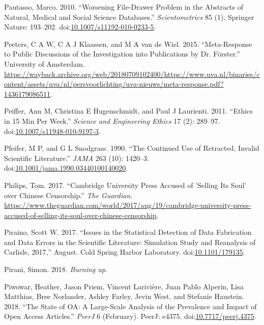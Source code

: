 \documentclass[a5paper]{book}
\begin{document}
\hypertarget{ref-doi:10.1007ux2fs11192-010-0233-5}{}
Pautasso, Marco. 2010. ``Worsening File-Drawer Problem in the Abstracts
of Natural, Medical and Social Science Databases.''
\emph{Scientometrics} 85 (1). Springer Nature: 193--202.
doi:\href{https://doi.org/10.1007/s11192-010-0233-5}{10.1007/s11192-010-0233-5}.

\hypertarget{ref-peeters2015}{}
Peeters, C A W, C A J Klaassen, and M A van de Wiel. 2015.
``Meta-Response to Public Discussions of the Investigation into
Publications by Dr. Förster.'' University of Amsterdam.
\url{https://wayback.archive.org/web/20180709102400/https://www.uva.nl/binaries/content/assets/uva/nl/persvoorlichting/uva-nieuws/meta-response.pdf?1436179086511}.

\hypertarget{ref-doi:10.1007ux2fs11948-010-9197-3}{}
Peiffer, Ann M, Christina E Hugenschmidt, and Paul J Laurienti. 2011.
``Ethics in 15 Min Per Week.'' \emph{Science and Engineering Ethics} 17
(2): 289--97.
doi:\href{https://doi.org/10.1007/s11948-010-9197-3}{10.1007/s11948-010-9197-3}.

\hypertarget{ref-doi:10.1001ux2fjama.1990.03440100140020}{}
Pfeifer, M P, and G L Snodgrass. 1990. ``The Continued Use of Retracted,
Invalid Scientific Literature.'' \emph{JAMA} 263 (10): 1420--3.
doi:\href{https://doi.org/10.1001/jama.1990.03440100140020}{10.1001/jama.1990.03440100140020}.

\hypertarget{ref-guardian-cup}{}
Philips, Tom. 2017. ``Cambridge University Press Accused of 'Selling Its
Soul' over Chinese Censorship.'' \emph{The Guardian}.
\url{https://www.theguardian.com/world/2017/aug/19/cambridge-university-press-accused-of-selling-its-soul-over-chinese-censorship}.

\hypertarget{ref-doi:10.1101ux2f179135}{}
Piraino, Scott W. 2017. ``Issues in the Statistical Detection of Data
Fabrication and Data Errors in the Scientific Literature: Simulation
Study and Reanalysis of Carlisle, 2017,'' August. Cold Spring Harbor
Laboratory. doi:\href{https://doi.org/10.1101/179135}{10.1101/179135}.

\hypertarget{ref-isbn:9780745335612}{}
Pirani, Simon. 2018. \emph{Burning up}.

\hypertarget{ref-doi:10.7717ux2fpeerj.4375}{}
Piwowar, Heather, Jason Priem, Vincent Larivière, Juan Pablo Alperin,
Lisa Matthias, Bree Norlander, Ashley Farley, Jevin West, and Stefanie
Haustein. 2018. ``The State of OA: A Large-Scale Analysis of the
Prevalence and Impact of Open Access Articles.'' \emph{PeerJ} 6
(February). PeerJ: e4375.
doi:\href{https://doi.org/10.7717/peerj.4375}{10.7717/peerj.4375}.
\end{document}
